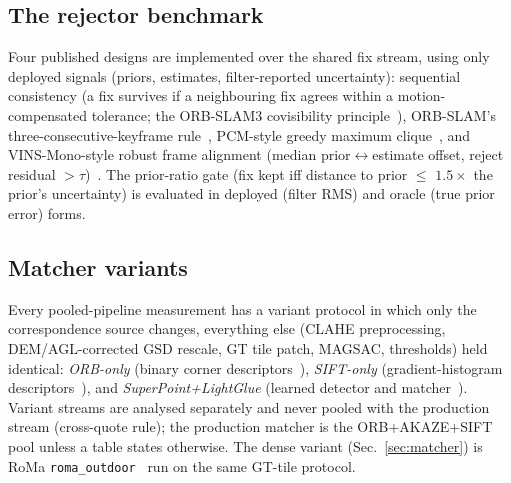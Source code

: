 \documentclass[journal]{IEEEtran}
\begin{document}
\subsection{The rejector benchmark}
Four published designs are implemented over the shared fix stream, using only deployed signals (priors, estimates, filter-reported uncertainty): sequential consistency (a fix survives if a neighbouring fix agrees within a motion-compensated tolerance; the ORB-SLAM3 covisibility principle~\cite{orbslam3}), ORB-SLAM's three-consecutive-keyframe rule~\cite{orbslam}, PCM-style greedy maximum clique~\cite{mangelson2018}, and VINS-Mono-style robust frame alignment (median prior$\leftrightarrow$estimate offset, reject residual $>\tau$)~\cite{vinsmono}. The prior-ratio gate (fix kept iff distance to prior $\leq$ $1.5\times$ the prior's uncertainty) is evaluated in deployed (filter RMS) and oracle (true prior error) forms.

\subsection{Matcher variants}
Every pooled-pipeline measurement has a variant protocol in which only the correspondence source changes, everything else (CLAHE preprocessing, DEM/AGL-corrected GSD rescale, GT tile patch, MAGSAC, thresholds) held identical: \emph{ORB-only} (binary corner descriptors~\cite{rublee2011}), \emph{SIFT-only} (gradient-histogram descriptors~\cite{lowe2004}), and \emph{SuperPoint+LightGlue} (learned detector and matcher~\cite{detone2018,sarlin2023}). Variant streams are analysed separately and never pooled with the production stream (cross-quote rule); the production matcher is the ORB+AKAZE+SIFT pool unless a table states otherwise. The dense variant (Sec.~\ref{sec:matcher}) is RoMa \texttt{roma\_outdoor}~\cite{roma} run on the same GT-tile protocol.
\end{document}
